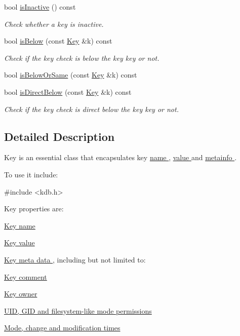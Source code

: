 \begin{DoxyCompactItemize}
bool \hyperlink{classkdb_1_1Key_adcd75cc13e9d766eaac72beb7d748bdb}{is\-Inactive} () const 
\begin{DoxyCompactList}\small\item\em Check whether a key is inactive.  \end{DoxyCompactList}\item 
bool \hyperlink{classkdb_1_1Key_a493893308d5b4c54d646cc0df5a076ae}{is\-Below} (const \hyperlink{classkdb_1_1Key}{Key} \&k) const 
\begin{DoxyCompactList}\small\item\em Check if the key check is below the key key or not.  \end{DoxyCompactList}\item 
bool \hyperlink{classkdb_1_1Key_a0d4d2d50f9e3624ade560b0f74267d86}{is\-Below\-Or\-Same} (const \hyperlink{classkdb_1_1Key}{Key} \&k) const 
\begin{DoxyCompactList}\small\item\em \end{DoxyCompactList}\item 
bool \hyperlink{classkdb_1_1Key_a3cc66b309bd42e67d7bc0e4234aa76a1}{is\-Direct\-Below} (const \hyperlink{classkdb_1_1Key}{Key} \&k) const 
\begin{DoxyCompactList}\small\item\em Check if the key check is direct below the key key or not.  \end{DoxyCompactList}\end{DoxyCompactItemize}


\subsection{Detailed Description}
Key is an essential class that encapsulates key \hyperlink{group__keyname}{name }, \hyperlink{group__keyvalue}{value } and \hyperlink{group__keymeta}{metainfo }.  

To use it include\-: 
\begin{DoxyCode}
\textcolor{preprocessor}{#include <kdb.h>}
\end{DoxyCode}


Key properties are\-:
\begin{DoxyItemize}
\item \hyperlink{group__keyname}{Key name }
\item \hyperlink{group__keyvalue}{Key value }
\item \hyperlink{group__keymeta}{Key meta data }, including but not limited to\-:
\begin{DoxyItemize}
\item \hyperlink{group__meta_gafb89735689929ff717cc9f2d0d0b46a2}{Key comment }
\item \hyperlink{group__meta_ga35922a017bee8b4bcb493bbdfad9d6f5}{Key owner }
\item \hyperlink{group__keymeta}{U\-I\-D, G\-I\-D and filesystem-\/like mode permissions }
\item \hyperlink{group__keymeta}{Mode, change and modification times }
\end{DoxyItemize}
\end{DoxyItemize}

